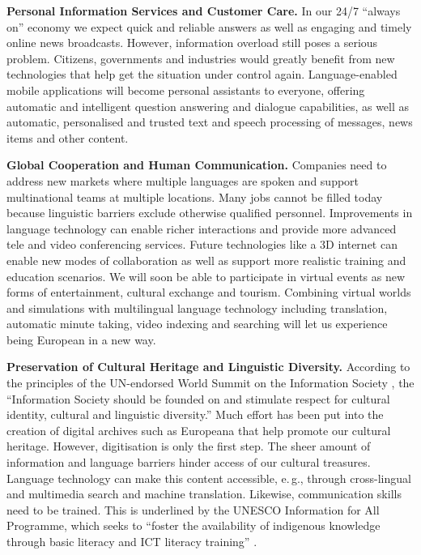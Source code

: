 \documentclass[10pt, plain]{../../metanetpaper}
\begin{document}
\begin{multicols}{2}
\textbf{Personal Information Services and Customer Care.} In our 24/7 ``always on'' economy we expect quick and reliable answers as well as engaging and timely online news broadcasts. However, information overload still poses a serious problem. Citizens, governments and industries would greatly benefit from new technologies that help get the situation under control again. Language-enabled mobile applications will become personal assistants to everyone, offering automatic and intelligent question answering and dialogue capabilities, as well as automatic, personalised and trusted text and speech processing of messages, news items and other content.

\textbf{Global Cooperation and Human Communication.} Companies need to address new markets where multiple languages are spoken and support multinational teams at multiple locations. Many jobs cannot be filled today because linguistic barriers exclude otherwise qualified personnel. Improvements in language technology can enable richer interactions and provide more advanced tele and video conferencing services. Future technologies like a 3D internet can enable new modes of collaboration as well as support more realistic training and education scenarios. We will soon be able to participate in virtual events as new forms of entertainment, cultural exchange and tourism. Combining virtual worlds and simulations with multilingual language technology including translation, automatic minute taking, video indexing and searching will let us experience being European in a new way.

\textbf{Preservation of Cultural Heritage and Linguistic Diversity.} According to the principles of the UN-endorsed World Summit on the Information Society \cite{worldsummit2003}, the “Information Society should be founded on and stimulate respect for cultural identity, cultural and linguistic diversity.” Much effort has been put into the creation of digital archives such as Europeana that help promote our cultural heritage. However, digitisation is only the first step. The sheer amount of information and language barriers hinder access of our cultural treasures. Language technology can make this content accessible, e.\,g., through cross-lingual and multimedia search and machine translation. Likewise, communication skills need to be trained. This is underlined by the UNESCO Information for All Programme, which seeks to “foster the availability of indigenous knowledge through basic literacy and ICT literacy training” \cite{Unesco2}.


\end{multicols}
\end{document}
